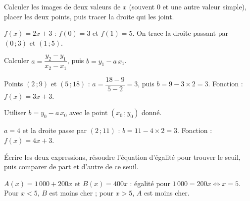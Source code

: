 Calculer les images de deux valeurs de $x$ (souvent $0$ et une autre valeur simple), placer
les deux points, puis tracer la droite qui les joint.
\begin{exemple}
$f(x)=2x+3$ : $f(0)=3$ et $f(1)=5$. On trace la droite passant par $(0\,;3)$ et
$(1\,;5)$.
\end{exemple}

Calculer $a=\dfrac{y_2-y_1}{x_2-x_1}$, puis $b=y_1-a\,x_1$.
\begin{exemple}
Points $(2\,;9)$ et $(5\,;18)$ : $a=\dfrac{18-9}{5-2}=3$, puis $b=9-3\times2=3$. Fonction :
$f(x)=3x+3$.
\end{exemple}

Utiliser $b=y_0-a\,x_0$ avec le point $(x_0\,;y_0)$ donné.
\begin{exemple}
$a=4$ et la droite passe par $(2\,;11)$ : $b=11-4\times2=3$. Fonction : $f(x)=4x+3$.
\end{exemple}

Écrire les deux expressions, résoudre l'équation d'égalité pour trouver le seuil, puis
comparer de part et d'autre de ce seuil.
\begin{exemple}
$A(x)=1\,000+200x$ et $B(x)=400x$ : égalité pour $1\,000=200x\iff x=5$. Pour $x<5$, $B$ est
moins cher ; pour $x>5$, $A$ est moins cher.
\end{exemple}


